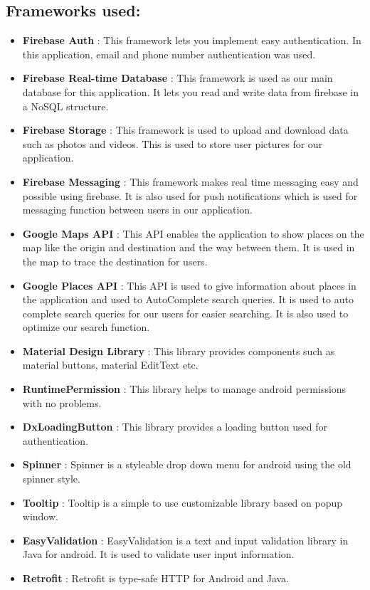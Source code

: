 \subsection{Frameworks used:}
\begin{itemize}
\item \textbf{Firebase Auth }: This framework lets you implement easy authentication. In this application, email and phone number authentication was used.
\item \textbf{Firebase Real-time Database }: This framework is used as our main database for this application. It lets you read and write data from firebase in a NoSQL structure. 
\item \textbf{Firebase Storage }: This framework is used to upload and download data such as photos and videos. This is used to store user pictures for our application.
\item \textbf{Firebase Messaging }: This framework makes real time messaging easy and possible using firebase. It is also used for push notifications which is used for messaging function between users in our application. 
\item \textbf{ Google Maps API }: This API enables the application to show places on the map like the origin and destination and the way between them. It is used in the map to trace the destination for users.
\item \textbf{Google Places API }: This API is used to give information about places in the application and used to AutoComplete search queries. It is used to auto complete search queries for our users for easier searching. It is also used to optimize our search function.
\item \textbf{Material Design Library }: This library provides components such as material buttons, material EditText etc.
\item \textbf{RuntimePermission }: This library helps to manage android permissions with no problems. 
\item \textbf{DxLoadingButton }: This library provides a loading button used for authentication. 
\item \textbf{Spinner }: Spinner is a styleable drop down menu for android using the old spinner style. 
\item \textbf{Tooltip }: Tooltip is a simple to use customizable library based on popup window. 
\item \textbf{EasyValidation }: EasyValidation is a text and input validation library in Java for android. It is used to validate user input information.
\item \textbf{Retrofit }: Retrofit is type-safe HTTP for Android and Java.
\end{itemize}

